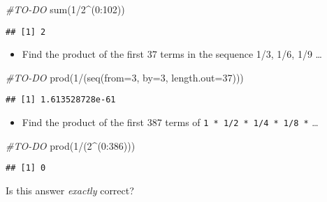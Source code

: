\documentclass[
]{article}
\newenvironment{Shaded}{\begin{snugshade}}{\end{snugshade}}
\newcommand{\AttributeTok}[1]{\textcolor[rgb]{0.77,0.63,0.00}{#1}}
\newcommand{\CommentTok}[1]{\textcolor[rgb]{0.56,0.35,0.01}{\textit{#1}}}
\newcommand{\DecValTok}[1]{\textcolor[rgb]{0.00,0.00,0.81}{#1}}
\newcommand{\FunctionTok}[1]{\textcolor[rgb]{0.00,0.00,0.00}{#1}}
\newcommand{\NormalTok}[1]{#1}
\newcommand{\SpecialCharTok}[1]{\textcolor[rgb]{0.00,0.00,0.00}{#1}}
\providecommand{\tightlist}{%
  \setlength{\itemsep}{0pt}\setlength{\parskip}{0pt}}
\begin{document}
\begin{Shaded}
\begin{Highlighting}[]
\CommentTok{\#TO{-}DO}
\FunctionTok{sum}\NormalTok{(}\DecValTok{1}\SpecialCharTok{/}\DecValTok{2}\SpecialCharTok{\^{}}\NormalTok{(}\DecValTok{0}\SpecialCharTok{:}\DecValTok{102}\NormalTok{))}
\end{Highlighting}
\end{Shaded}

\begin{verbatim}
## [1] 2
\end{verbatim}

\begin{itemize}
\tightlist
\item
  Find the product of the first 37 terms in the sequence 1/3, 1/6, 1/9
  \ldots{}
\end{itemize}

\begin{Shaded}
\begin{Highlighting}[]
\CommentTok{\#TO{-}DO}
\FunctionTok{prod}\NormalTok{(}\DecValTok{1}\SpecialCharTok{/}\NormalTok{(}\FunctionTok{seq}\NormalTok{(}\AttributeTok{from=}\DecValTok{3}\NormalTok{, }\AttributeTok{by=}\DecValTok{3}\NormalTok{, }\AttributeTok{length.out=}\DecValTok{37}\NormalTok{)))}
\end{Highlighting}
\end{Shaded}

\begin{verbatim}
## [1] 1.613528728e-61
\end{verbatim}

\begin{itemize}
\tightlist
\item
  Find the product of the first 387 terms of
  \texttt{1\ *\ 1/2\ *\ 1/4\ *\ 1/8\ *} \ldots{}
\end{itemize}

\begin{Shaded}
\begin{Highlighting}[]
\CommentTok{\#TO{-}DO}
\FunctionTok{prod}\NormalTok{(}\DecValTok{1}\SpecialCharTok{/}\NormalTok{(}\DecValTok{2}\SpecialCharTok{\^{}}\NormalTok{(}\DecValTok{0}\SpecialCharTok{:}\DecValTok{386}\NormalTok{)))}
\end{Highlighting}
\end{Shaded}

\begin{verbatim}
## [1] 0
\end{verbatim}

Is this answer \emph{exactly} correct?
\end{document}
